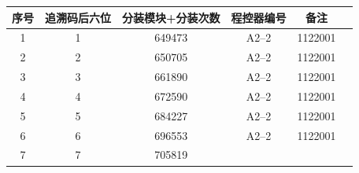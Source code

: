 \documentclass[UTF8,10pt,a4paper,fontset=fandol]{ctexart}
\newcommand{\fieldvalue}[1]{#1}
\begin{document}
\begin{center}
\small
\begin{tabularx}{\textwidth}{|c|c|c|c|c|X|}
\hline
序号 & 追溯码后六位 & 分装模块+分装次数 & 程控器编号 & 备注 \\
\hline
1 &
\fieldvalue{1} &
\fieldvalue{649473} &
\fieldvalue{A2--2} &
\fieldvalue{1122001} & \\
\hline
2 &
\fieldvalue{2} &
\fieldvalue{650705} &
\fieldvalue{A2--2} &
\fieldvalue{1122001} & \\
\hline
3 &
\fieldvalue{3} &
\fieldvalue{661890} &
\fieldvalue{A2--2} &
\fieldvalue{1122001} & \\
\hline
4 &
\fieldvalue{4} &
\fieldvalue{672590} &
\fieldvalue{A2--2} &
\fieldvalue{1122001} & \\
\hline
5 &
\fieldvalue{5} &
\fieldvalue{684227} &
\fieldvalue{A2--2} &
\fieldvalue{1122001} & \\
\hline
6 &
\fieldvalue{6} &
\fieldvalue{696553} &
\fieldvalue{A2--2} &
\fieldvalue{1122001} & \\
\hline
7 &
\fieldvalue{7} &
\fieldvalue{705819} &

\end{tabularx}
\end{center}
\end{document}
